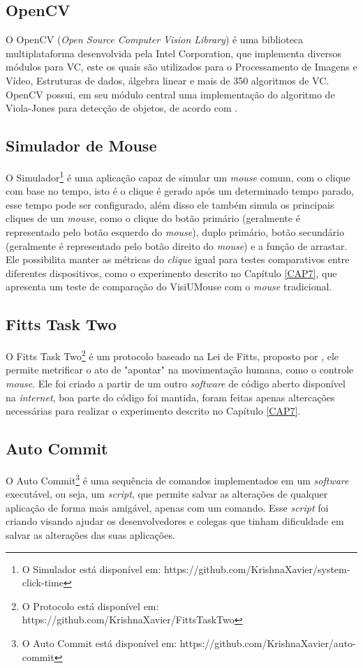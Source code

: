 \subsection{OpenCV}
O OpenCV (\textit{Open Source Computer Vision Library}) é uma biblioteca multiplataforma desenvolvida pela Intel Corporation, que implementa diversos módulos para VC, este os quais são utilizados para o Processamento de Imagens e Vídeo, Estruturas de dados, álgebra linear e mais de 350 algoritmos de VC. OpenCV possui, em seu módulo central uma implementação do algoritmo de Viola-Jones para detecção de objetos, de acordo com \cite{bradski2008learning}.

\subsection{Simulador de Mouse}
O Simulador\footnote{O Simulador está disponível em: https://github.com/KrishnaXavier/system-click-time} é uma aplicação capaz de simular um \textit{mouse} comum, com o clique com base no tempo, isto é o clique é gerado após um determinado tempo parado, esse tempo pode ser configurado, além disso ele também simula os principais cliques de um \textit{mouse}, como o clique do botão primário (geralmente é representado pelo botão esquerdo do \textit{mouse}), duplo primário, botão secundário (geralmente é representado pelo botão direito do \textit{mouse}) e a função de arrastar. Ele possibilita manter as métricas do \textit{clique} igual para testes comparativos entre diferentes dispositivos, como o experimento descrito no Capítulo \ref{CAP7}, que apresenta um teste de comparação do VisiUMouse com o \textit{mouse} tradicional.


\subsection{Fitts Task Two}
O Fitts Task Two\footnote{O Protocolo está disponível em: https://github.com/KrishnaXavier/FittsTaskTwo} é um protocolo baseado na Lei de Fitts, proposto por , ele permite metrificar o ato de "apontar" na movimentação humana, como o controle \textit{mouse}. Ele foi criado a partir de um outro \textit{software} de código aberto disponível na \textit{internet}, boa parte do código foi mantida, foram feitas apenas altercações necessárias para realizar o experimento descrito no Capítulo \ref{CAP7}.

\subsection{Auto Commit}
O Auto Commit\footnote{O Auto Commit está disponível em: https://github.com/KrishnaXavier/auto-commit} é uma sequência de comandos implementados em um \textit{software} executável, ou seja, um \textit{script}, que permite salvar as alterações de qualquer aplicação de forma mais amigável, apenas com um comando. Esse \textit{script} foi criando visando ajudar os desenvolvedores e colegas que tinham dificuldade em salvar as alterações das suas aplicações.


